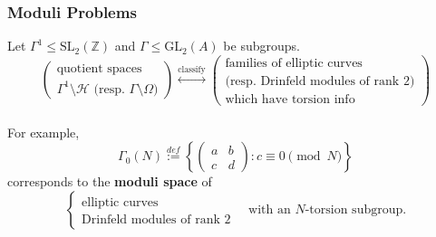 \documentclass{beamer}
\numberwithin{equation}{section}
\numberwithin{case}{theorem}
\newcommand{\cH}{\mathcal{H}}		%
\newcommand{\bbZ}{\mathbb{Z}}		%
\newcommand{\GL}{\mathrm{GL}} 	%
\newcommand{\SL}{\mathrm{SL}} 	%
\newcommand{\<}{\left\langle}
\renewcommand{\>}{\right\rangle}
\begin{document}
\begin{frame}
	\frametitle{Moduli Problems}
	Let $\Gamma^1\leq \SL_2(\bbZ)$ and $\Gamma\leq \GL_2(A)$ be subgroups.\pause
	\[\left(\begin{array}{c}\text{quotient spaces}\\\Gamma^1\setminus\cH \text{ (resp. }\Gamma\setminus\Omega)\end{array}\right)
		\overset{\text{classify}}{\leftrightarrow}
		\left(\begin{array}{c}\text{families of elliptic curves}\\\text{(resp. Drinfeld modules of rank }2)\\\text{which have torsion info}\end{array}\right)
	\]
	\pause \\
	
	For example, \[\Gamma_0(N)\overset{def}{:=}\left\{\left(\begin{array}{cc}a&b\\c&d\end{array}\right): c\equiv 0\pmod{N}\right\}\]
	corresponds to the \textbf{moduli space} of \[\begin{cases}\text{elliptic curves}\\
	\text{Drinfeld modules of rank }2\end{cases}\quad\text{with an }N\text{-torsion subgroup.}\]
\end{frame}	
	
\end{document}

